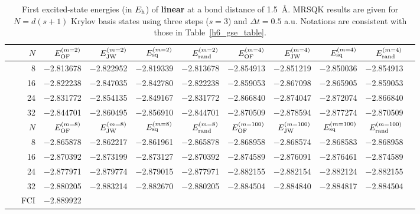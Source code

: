 \documentclass[journal=jctcce,manuscript=article]{achemso}
\newcommand*{\Eh}{$E_{\rm h}$\xspace}
\newcommand{\methodabbr}[0]{MRSQK\xspace}
\begin{document}
\begin{table}[!ht]
\centering
\renewcommand{\arraystretch}{1.1}
\caption{First excited-state energies (in \Eh) of \textbf{linear } at a bond distance of 1.5~\AA{}. \methodabbr results are given for $N = d (s+1)$ Krylov basis states using three steps ($s = 3$) and $\Delta t = 0.5$ a.u.
Notations are consistent with those in Table~\ref{h6_gse_table}.}
\footnotesize
\begin{tabular*}{\columnwidth}{@{\extracolsep{\fill}}*{1}{r}*{9}{r}@{}}    
 \toprule
     $N$     &    $E^{(m=2)}_{\rm{OF}}$    &    $E^{(m=2)}_{\rm{JW}}$     &   $E^{(m=2)}_{\rm{sq}}$    &     $E^{(m=2)}_{\rm{rand}}$    &   $E^{(m=4)}_{\rm{OF}}$    &   $E^{(m=4)}_{\rm{JW}}$    &   $E^{(m=4)}_{\rm{sq}}$    &    $E^{(m=4)}_{\rm{rand}}$  \\
     \midrule
  8      &   $-$2.813678   &    $-$2.822952   &    $-$2.819339   &   $-$2.813678     &   $-$2.854913    &   $-$2.851219   &   $-$2.850036   &   $-$2.854913  \\
 16       &   $-$2.822238   &    $-$2.847035   &    $-$2.842780  &   $-$2.822238     &   $-$2.859053    &   $-$2.867098   &   $-$2.865905   &   $-$2.859053  \\
  24      &   $-$2.831772   &    $-$2.854135  &    $-$2.849167   &   $-$2.831772     &   $-$2.866840   &   $-$2.874047   &   $-$2.872074   &   $-$2.866840  \\
  32      &   $-$2.844701   &    $-$2.860495   &    $-$2.856910   &   $-$2.844701     &   $-$2.870509    &   $-$2.878594   &   $-$2.877274   &   $-$2.870509  \\
 \hline
 \toprule
  $N$    &     $E^{(m=8)}_{\rm{OF}}$    &   $E^{(m=8)}_{\rm{JW}}$    &   $E^{(m=8)}_{\rm{sq}}$   &   $E^{(m=8)}_{\rm{rand}}$   &     $E^{(m=100)}_{\rm{OF}}$    &   $E^{(m=100)}_{\rm{JW}}$    &   $E^{(m=100)}_{\rm{sq}}$   &   $E^{(m=100)}_{\rm{rand}}$   \\
  \midrule
  8        &   $-$2.865878   &    $-$2.862217   &    $-$2.861961   &   $-$2.865878     &   $-$2.868958    &   $-$2.868574   &   $-$2.868583   &   $-$2.868958  \\
  16      &   $-$2.870392  &    $-$2.873199   &    $-$2.873127   &   $-$2.870392     &   $-$2.874589    &   $-$2.876091   &   $-$2.876461   &   $-$2.874589  \\
  24      &   $-$2.877971   &    $-$2.879774   &    $-$2.879015   &   $-$2.877971            &   $-$2.882155    &   $-$2.882154   &   $-$2.882124   &   $-$2.882155  \\
  32      &   $-$2.880205   &    $-$2.883214   &    $-$2.882670   &   $-$2.880205           &   $-$2.884504   &   $-$2.884840    &   $-$2.884817   &   $-$2.884504  \\[3pt] 
~~~FCI       &  $-$2.889922         \\  %
\bottomrule
\hline
\end{tabular*}
\label{h6_1stese_table}
\end{table}
\end{document}
